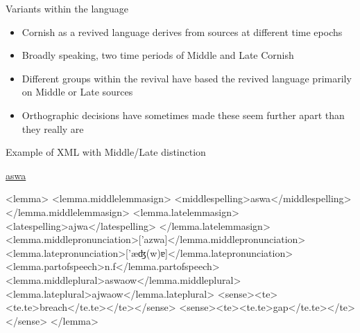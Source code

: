 \documentclass[handout]{beamer}
\begin{document}
\begin{frame}{Variants within the language}
\begin{itemize}
\item<1-> Cornish as a revived language derives from sources at different time epochs
\item<2-> Broadly speaking, two time periods of Middle and Late Cornish
\item<3-> Different groups within the revival have based the revived language primarily on Middle or Late sources
\item<4-> Orthographic decisions have sometimes made these seem further apart than they really are
\end{itemize}
\end{frame}
\begin{frame}[fragile]{Example of XML with Middle/Late distinction}
\begin{scriptsize}
\href{http://www.cornishdictionary.org.uk/?locale=en#aswa}{aswa}
\begin{semiverbatim}
\color{gray}
<lemma>
<lemma.middlelemmasign>
<middlespelling>{\color{black}aswa}</middlespelling>
</lemma.middlelemmasign>
<lemma.latelemmasign>
<latespelling>{\color{black}ajwa}</latespelling>
</lemma.latelemmasign>
<lemma.middlepronunciation>['azwa]</lemma.middlepronunciation>
<lemma.latepronunciation>['æʤ(w)ɐ]</lemma.latepronunciation>
<lemma.partofspeech>{\color{black}n.f}</lemma.partofspeech>
<lemma.middleplural>{\color{black}aswaow}</lemma.middleplural>
<lemma.lateplural>{\color{black}ajwaow}</lemma.lateplural>
<sense><te><te.te>{\color{black}breach}</te.te></te></sense>
<sense><te><te.te>{\color{black}gap}</te.te></te></sense>
</lemma>
\end{semiverbatim}
\end{scriptsize}
\end{frame}
\end{document}

